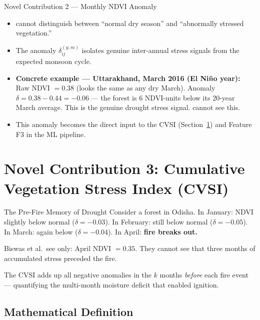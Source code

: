 \documentclass[12pt, a4paper]{article}
\begin{document}
\begin{novelbox}{Novel Contribution 2 --- Monthly NDVI Anomaly}
\begin{itemize}[leftmargin=1.5em,itemsep=2pt]
  \item \citet{biswas2025} cannot distinguish between
        ``normal dry season'' and ``abnormally stressed vegetation.''
  \item The anomaly $\delta_{ij}^{(y,m)}$ isolates genuine
        inter-annual stress signals from the expected monsoon cycle.
  \item \textbf{Concrete example --- Uttarakhand, March 2016
        (El Ni\~{n}o year):}
        Raw NDVI $= 0.38$ (looks the same as any dry March).
        Anomaly $\delta = 0.38 - 0.44 = -0.06$ ---
        the forest is 6 NDVI-units below its 20-year March average.
        This is the genuine drought stress signal.
        \citet{biswas2025} cannot see this.
  \item This anomaly becomes the direct input to the CVSI
        (Section~\ref{sec:cvsi}) and Feature F3 in the ML pipeline.
\end{itemize}
\end{novelbox}

\section{Novel Contribution 3: Cumulative Vegetation Stress Index (CVSI)}
\label{sec:cvsi}

\begin{simplebox}{The Pre-Fire Memory of Drought}
Consider a forest in Odisha.
In January: NDVI slightly below normal ($\delta = -0.03$).
In February: still below normal ($\delta = -0.05$).
In March: again below ($\delta = -0.04$).
In April: \textbf{fire breaks out.}

\medskip
Biswas et al.\ see only: April NDVI $= 0.35$.
They cannot see that three months of accumulated stress preceded the fire.

The CVSI adds up all negative anomalies in the $k$ months
\emph{before} each fire event --- quantifying the multi-month
moisture deficit that enabled ignition.
\end{simplebox}

\subsection{Mathematical Definition}
\end{document}
